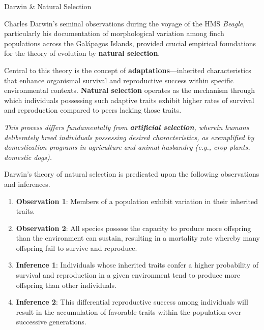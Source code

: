 \documentclass[10pt]{article}
\begin{document}
    \begin{core}[label=core:darwin]{Darwin \& Natural Selection}

      Charles Darwin's seminal observations during the voyage of the HMS \textit{Beagle}, particularly his documentation of morphological variation among finch populations across the Galápagos Islands, provided crucial empirical foundations for the theory of evolution by \textbf{natural selection}. 


      Central to this theory is the concept of \textbf{adaptations}---inherited characteristics that enhance organismal survival and reproductive success within specific environmental contexts. \textbf{Natural selection} operates as the mechanism through which individuals possessing such adaptive traits exhibit higher rates of survival and reproduction compared to peers lacking those traits. 

      \textit{This process differs fundamentally from \textbf{artificial selection}, wherein humans deliberately breed individuals possessing desired characteristics, as exemplified by domestication programs in agriculture and animal husbandry (e.g., crop plants, domestic dogs).}

      Darwin's theory of natural selection is predicated upon the following observations and inferences.

      \begin{enumerate}

        \item \textbf{Observation 1}: Members of a population exhibit variation in their inherited traits.

        \item \textbf{Observation 2}: All species possess the capacity to produce more offspring than the environment can sustain, resulting in a mortality rate whereby many offspring fail to survive and reproduce.

        \item \textbf{Inference 1}: Individuals whose inherited traits confer a higher probability of survival and reproduction in a given environment tend to produce more offspring than other individuals.

        \item \textbf{Inference 2}: This differential reproductive success among individuals will result in the accumulation of favorable traits within the population over successive generations.


\end{enumerate}
\end{core}
\end{document}
